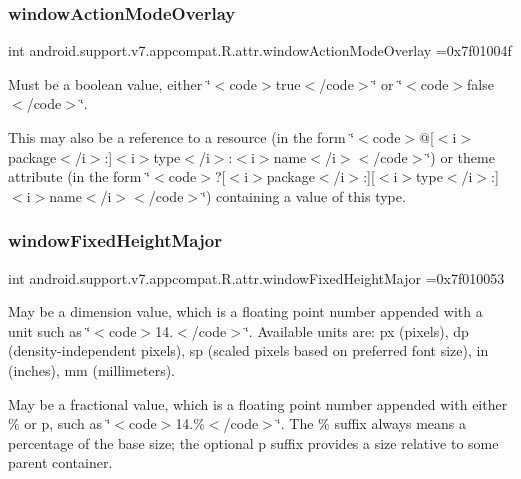 \subsubsection{\texorpdfstring{window\+Action\+Mode\+Overlay}{windowActionModeOverlay}}
{\footnotesize\ttfamily int android.\+support.\+v7.\+appcompat.\+R.\+attr.\+window\+Action\+Mode\+Overlay =0x7f01004f\hspace{0.3cm}{\ttfamily [static]}}

Must be a boolean value, either \char`\"{}$<$code$>$true$<$/code$>$\char`\"{} or \char`\"{}$<$code$>$false$<$/code$>$\char`\"{}. 

This may also be a reference to a resource (in the form \char`\"{}$<$code$>$@\mbox{[}$<$i$>$package$<$/i$>$\+:\mbox{]}$<$i$>$type$<$/i$>$\+:$<$i$>$name$<$/i$>$$<$/code$>$\char`\"{}) or theme attribute (in the form \char`\"{}$<$code$>$?\mbox{[}$<$i$>$package$<$/i$>$\+:\mbox{]}\mbox{[}$<$i$>$type$<$/i$>$\+:\mbox{]}$<$i$>$name$<$/i$>$$<$/code$>$\char`\"{}) containing a value of this type. \mbox{\label{classandroid_1_1support_1_1v7_1_1appcompat_1_1R_1_1attr_a568ba891a04bf2c4a15c2ead6fbea181}} 
\subsubsection{\texorpdfstring{window\+Fixed\+Height\+Major}{windowFixedHeightMajor}}
{\footnotesize\ttfamily int android.\+support.\+v7.\+appcompat.\+R.\+attr.\+window\+Fixed\+Height\+Major =0x7f010053\hspace{0.3cm}{\ttfamily [static]}}

May be a dimension value, which is a floating point number appended with a unit such as \char`\"{}$<$code$>$14.\+5sp$<$/code$>$\char`\"{}. Available units are\+: px (pixels), dp (density-\/independent pixels), sp (scaled pixels based on preferred font size), in (inches), mm (millimeters). 

May be a fractional value, which is a floating point number appended with either \% or p, such as \char`\"{}$<$code$>$14.\%$<$/code$>$\char`\"{}. The \% suffix always means a percentage of the base size; the optional p suffix provides a size relative to some parent container. 

